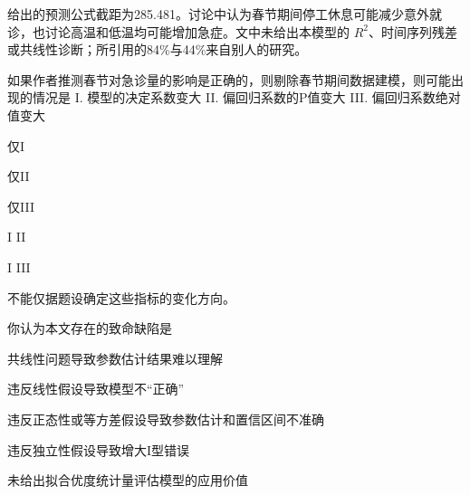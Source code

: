 给出的预测公式截距为285.481。讨论中认为春节期间停工休息可能减少意外就诊，也讨论高温和低温均可能增加急症。文中未给出本模型的 \(R^2\)、时间序列残差或共线性诊断；所引用的84\%与44\%来自别人的研究。


\par\addvspace{6pt}\noindent\begin{minipage}{\linewidth}


如果作者推测春节对急诊量的影响是正确的，则剔除春节期间数据建模，则可能出现的情况是 I. 模型的决定系数变大 II. 偏回归系数的P值变大 III. 偏回归系数绝对值变大


\begin{choices}

\item 仅I

\item 仅II

\item 仅III

\item I II

\item I III

\item 不能仅据题设确定这些指标的变化方向。

\end{choices}

\end{minipage}\par\vspace{4pt}

\par\addvspace{6pt}\noindent\begin{minipage}{\linewidth}


你认为本文存在的致命缺陷是


\begin{choices}

\item 共线性问题导致参数估计结果难以理解

\item 违反线性假设导致模型不``正确''

\item 违反正态性或等方差假设导致参数估计和置信区间不准确

\item 违反独立性假设导致增大I型错误

\item 未给出拟合优度统计量评估模型的应用价值

\end{choices}

\end{minipage}\par\vspace{4pt}

